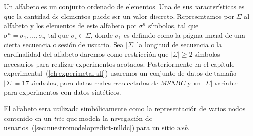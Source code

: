 
Un alfabeto es un conjunto ordenado de elementos. Una de sus características es que la cantidad de elementos puede ser un valor discreto. Representamos por $\Sigma$ al alfabeto y los elementos de este  alfabeto por $\sigma^{n}$ símbolos, tal que $\sigma^{n}= \sigma_{1}, \dots, \sigma_{n} \mbox{ tal que } \sigma_{i} \in \Sigma$, donde {$\sigma_{1}$}\label{concept-alphabet-homepage} es definido como la página inicial de una cierta secuencia  o sesión de usuario. Sea $|\Sigma|$ la longitud de secuencia o la cardinalidad del alfabeto daremos como restricción que $|\Sigma| \geq 2$ símbolos~\cite{Dmitry2002} necesarios para realizar experimentos acotados. Posteriormente en el capítulo experimental~(\ref{ch:experimetal-all}) usaremos un conjunto de datos de tamaño $|\Sigma| = 17\  \mbox{símbolos}$, para datos reales recolectados de \emph{MSNBC}\cite{Claude2014} y un $|\Sigma|$ variable para experimentos con datos sintéticos.

El alfabeto sera utilizado simbólicamente como la representación de varios nodos contenido en un \emph{trie} que {modela la navegación de usuarios}~(\ref{sec:nuestromodelopredict-mlldc}) para un sitio \emph{web}.
